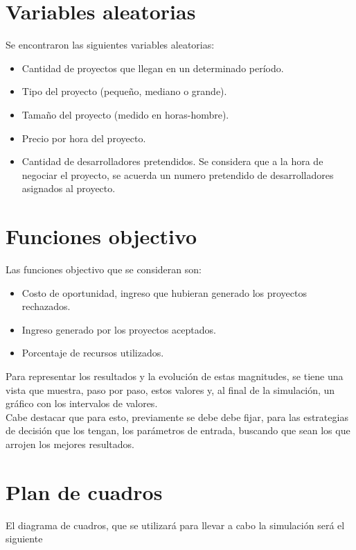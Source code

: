 \section{Variables aleatorias}
Se encontraron las siguientes variables aleatorias:

\begin{itemize}
    \item Cantidad de proyectos que llegan en un determinado período.
    \item Tipo del proyecto (pequeño, mediano o grande).
    \item Tamaño del proyecto (medido en horas-hombre).
    \item Precio por hora del proyecto.
    \item Cantidad de desarrolladores pretendidos. Se considera que a la hora de negociar el proyecto, se acuerda un numero pretendido de desarrolladores asignados al proyecto.
\end{itemize}

\section{Funciones objectivo}
Las funciones objectivo que se consideran son:

\begin{itemize}
    \item Costo de oportunidad, ingreso que hubieran generado los proyectos rechazados.
    \item Ingreso generado por los proyectos aceptados.
    \item Porcentaje de recursos utilizados.
\end{itemize}

Para representar los resultados y la evolución de estas magnitudes, se tiene una vista que muestra, paso por paso, estos valores y, al final de la simulación, un
gráfico con los intervalos de valores. \\

Cabe destacar que para esto, previamente se debe debe fijar, para las estrategias de decisión que los tengan, los parámetros de entrada, buscando que sean los
que arrojen los mejores resultados.\\

\section{Plan de cuadros}

El diagrama de cuadros, que se utilizará para llevar a cabo la simulación será el siguiente


